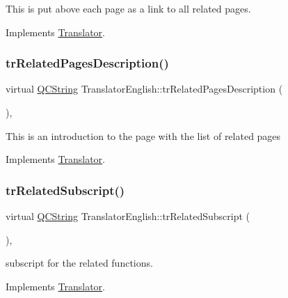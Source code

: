 This is put above each page as a link to all related pages. 

Implements \mbox{\hyperlink{class_translator}{Translator}}.

\mbox{\label{class_translator_english_a0f4b6bc562bbc39c22e70c26f2b7ebd6}} 
\subsubsection{\texorpdfstring{trRelatedPagesDescription()}{trRelatedPagesDescription()}}
{\footnotesize\ttfamily virtual \mbox{\hyperlink{class_q_c_string}{Q\+C\+String}} Translator\+English\+::tr\+Related\+Pages\+Description (\begin{DoxyParamCaption}{ }\end{DoxyParamCaption})\hspace{0.3cm}{\ttfamily [inline]}, {\ttfamily [virtual]}}

This is an introduction to the page with the list of related pages 

Implements \mbox{\hyperlink{class_translator}{Translator}}.

\mbox{\label{class_translator_english_a14e54075d59429884b4342515d6795e2}} 
\subsubsection{\texorpdfstring{trRelatedSubscript()}{trRelatedSubscript()}}
{\footnotesize\ttfamily virtual \mbox{\hyperlink{class_q_c_string}{Q\+C\+String}} Translator\+English\+::tr\+Related\+Subscript (\begin{DoxyParamCaption}{ }\end{DoxyParamCaption})\hspace{0.3cm}{\ttfamily [inline]}, {\ttfamily [virtual]}}

subscript for the related functions. 

Implements \mbox{\hyperlink{class_translator}{Translator}}.

\mbox{\label{class_translator_english_a4c9f0694cf6a8fa07dd02ae1811a7eed}} 
